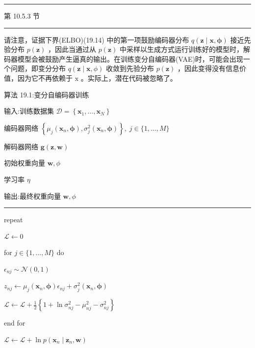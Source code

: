 \documentclass[10pt]{report}
\newcommand{\HRule}{\begin{center}\rule{0.9\linewidth}{0.2mm}\end{center}}
\begin{document}
\HRule

第 10.5.3 节

\HRule

请注意，证据下界(ELBO)(19.14) 中的第一项鼓励编码器分布 \(q\left( {\mathbf{z} \mid  \mathbf{x},\mathbf{\phi }}\right)\) 接近先验分布 \(p\left( \mathbf{z}\right)\) ，因此当通过从 \(p\left( \mathbf{z}\right)\) 中采样以生成方式运行训练好的模型时，解码器模型会被鼓励产生逼真的输出。在训练变分自编码器(VAE)时，可能会出现一个问题，即变分分布 \(q\left( {\mathbf{z} \mid  \mathbf{x},\phi }\right)\) 收敛到先验分布 \(p\left( \mathbf{z}\right)\) ，因此变得没有信息价值，因为它不再依赖于 \(\mathrm{x}\) 。实际上，潜在代码被忽略了。

算法 19.1:变分自编码器训练

输入:训练数据集 \(\mathcal{D} = \left\{  {{\mathbf{x}}_{1},\ldots ,{\mathbf{x}}_{N}}\right\}\)

编码器网络 \(\left\{  {{\mu }_{j}\left( {{\mathbf{x}}_{n},\mathbf{\phi }}\right) ,{\sigma }_{j}^{2}\left( {{\mathbf{x}}_{n},\mathbf{\phi }}\right) }\right\}  ,\;j \in  \{ 1,\ldots ,M\}\)

解码器网络 \(\mathbf{g}\left( {\mathbf{z},\mathbf{w}}\right)\)

初始权重向量 \(\mathbf{w},\phi\)

学习率 \(\eta\)

输出:最终权重向量 \(\mathbf{w},\phi\)

\HRule

repeat

\hspace*{1em} \(\mathcal{L} \leftarrow  0\)

\hspace*{1em} for \(j \in  \{ 1,\ldots ,M\}\) do

\hspace*{2em} \({\epsilon }_{nj} \sim  \mathcal{N}\left( {0,1}\right)\)

\hspace*{2em} \({z}_{nj} \leftarrow  {\mu }_{j}\left( {{\mathbf{x}}_{n},\mathbf{\phi }}\right) {\epsilon }_{nj} + {\sigma }_{j}^{2}\left( {{\mathbf{x}}_{n},\mathbf{\phi }}\right)\)

\hspace*{2em} \(\mathcal{L} \leftarrow  \mathcal{L} + \frac{1}{2}\left\{  {1 + \ln {\sigma }_{nj}^{2} - {\mu }_{nj}^{2} - {\sigma }_{nj}^{2}}\right\}\)

\hspace*{1em} end for

\hspace*{1em} \(\mathcal{L} \leftarrow  \mathcal{L} + \ln p\left( {{\mathbf{x}}_{n} \mid  {\mathbf{z}}_{n},\mathbf{w}}\right)\)
\end{document}
